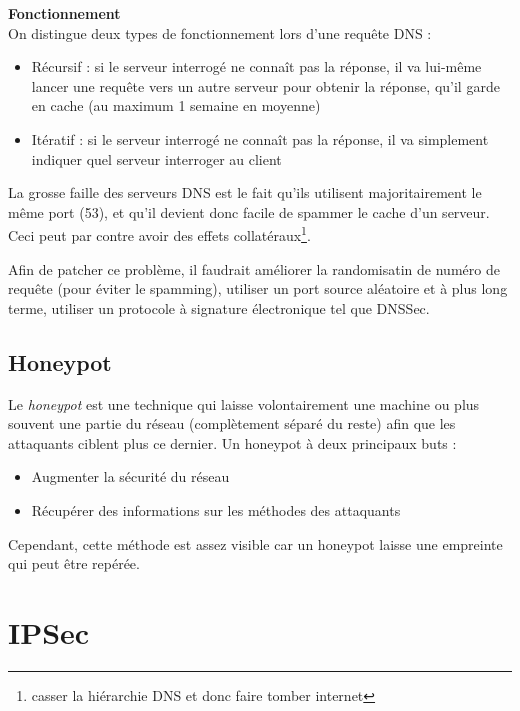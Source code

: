 \documentclass[journal, a4paper]{IEEEtran}
\begin{document}
		\textbf{Fonctionnement}\\
		On distingue deux types de fonctionnement lors d'une requête DNS :
		\begin{itemize}
			\item Récursif : si le serveur interrogé ne connaît pas la réponse, il va lui-même lancer une requête vers un autre serveur pour obtenir la réponse, qu'il garde en cache (au maximum 1 semaine en moyenne)
			\item Itératif : si le serveur interrogé ne connaît pas la réponse, il va simplement indiquer quel serveur interroger au client
		\end{itemize}
		
		La grosse faille des serveurs DNS est le fait qu'ils utilisent majoritairement le même port (53), et qu'il devient donc facile de spammer le cache d'un serveur. Ceci peut par contre avoir des effets collatéraux\footnote{casser la hiérarchie DNS et donc faire tomber internet}.
		
		Afin de patcher ce problème, il faudrait améliorer la randomisatin de numéro de requête (pour éviter le spamming), utiliser un port source aléatoire et à plus long terme, utiliser un protocole à signature électronique tel que DNSSec.
		
	\subsection{Honeypot}
	
		Le \textit{honeypot} est une technique qui laisse volontairement une machine ou plus souvent une partie du réseau (complètement séparé du reste) afin que les attaquants ciblent plus ce dernier. Un honeypot à deux principaux buts :
		\begin{itemize}
			\item Augmenter la sécurité du réseau
			\item Récupérer des informations sur les méthodes des attaquants
		\end{itemize}
		
		Cependant, cette méthode est assez visible car un honeypot laisse une empreinte qui peut être repérée.
		
\section{IPSec}
\end{document}
